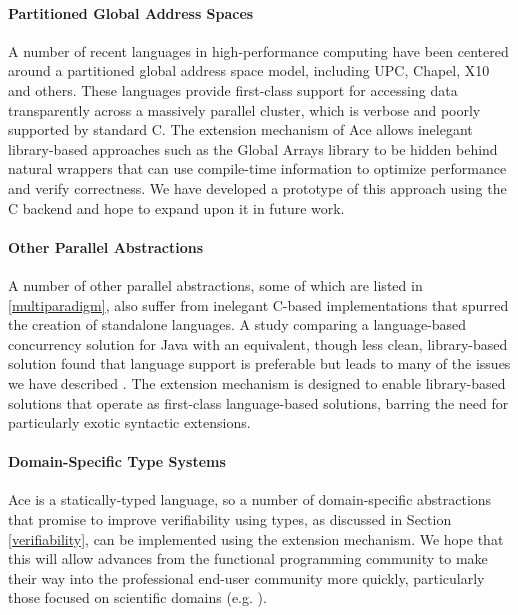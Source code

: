 \documentclass[10pt]{sigplanconf}
\begin{document}
\paragraph{Partitioned Global Address Spaces}
A number of recent languages in high-performance computing have been centered around a partitioned global address space model, including UPC, Chapel, X10 and others. These languages provide first-class support for accessing data transparently across a massively parallel cluster, which is verbose and poorly supported by standard C. The extension mechanism of Ace allows inelegant library-based approaches such as the Global Arrays library to be hidden behind natural wrappers that can use compile-time information to optimize performance and verify correctness. We have developed a prototype of this approach using the C backend and hope to expand upon it in future work.

\paragraph{Other Parallel Abstractions}
A number of other parallel abstractions, some of which are listed in \ref{multiparadigm}, also suffer from inelegant C-based implementations that spurred the creation of standalone languages. A study comparing a language-based concurrency solution for Java with an equivalent, though less clean, library-based solution found that language support is preferable but leads to many of the issues we have described \cite{cave2010comparing}. The extension mechanism is designed to enable library-based solutions that operate as first-class language-based solutions, barring the need for particularly exotic syntactic extensions.

\paragraph{Domain-Specific Type Systems}
Ace is a statically-typed language, so a number of domain-specific abstractions that promise to improve verifiability using types, as discussed in Section \ref{verifiability}, can be implemented using the extension mechanism. We hope that this will allow advances from the functional programming community to make their way into the professional end-user community more quickly, particularly those focused on scientific domains (e.g. \cite{conf/cefp/Kennedy09}).
\end{document}
